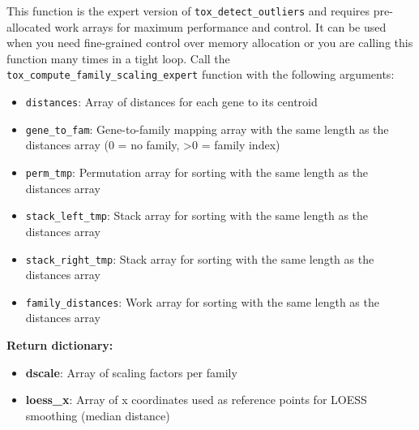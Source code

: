 \begin{enumerate}
\begin{enumerate}
                  This function is the expert version of \texttt{tox\_detect\_outliers}
                  and requires pre-allocated work arrays for maximum performance and
                  control. It can be used when you need fine-grained control over memory
                  allocation or you are calling this function many times in a tight loop.
                  Call the \texttt{tox\_compute\_family\_scaling\_expert} function with the
                  following arguments:
                  
                  \begin{itemize}
                    \item \texttt{distances}: Array of distances for each gene to its centroid
                          
                    \item \texttt{gene\_to\_fam}: Gene-to-family mapping array with the same
                          length as the distances array (0 = no family, \textgreater 0 = family
                          index)
                          
                    \item \texttt{perm\_tmp}: Permutation array for sorting with the same
                          length as the distances array
                          
                    \item \texttt{stack\_left\_tmp}: Stack array for sorting with the same
                          length as the distances array
                          
                    \item \texttt{stack\_right\_tmp}: Stack array for sorting with the same
                          length as the distances array
                          
                    \item \texttt{family\_distances}: Work array for sorting with the same
                          length as the distances array
                  \end{itemize}
                  
                  \textbf{Return dictionary:}
                  \begin{itemize}
                    \item \textbf{dscale}: Array of scaling factors per family
                          
                    \item \textbf{loess\_x}: Array of x coordinates used as reference points
                          for LOESS smoothing (median distance)
                          

\end{itemize}
\end{enumerate}
\end{enumerate}
